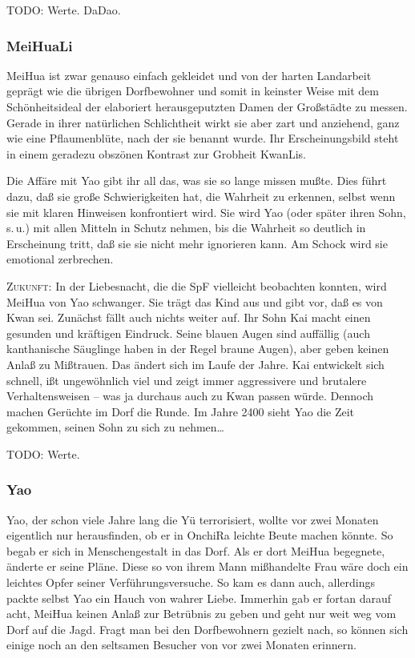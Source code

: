 \documentclass[
a4paper,
twoside,
DIV=calc,
BCOR=4mm,
fontsize=9pt,
twocolumn=on,
titlepage=on,
parskip=half
]{scrartcl}
\begin{document}
TODO: Werte. DaDao.

\subsubsection{MeiHuaLi}

MeiHua ist zwar genauso einfach gekleidet und von der harten
Landarbeit geprägt wie die übrigen Dorfbewohner und somit in keinster
Weise mit dem Schönheitsideal der elaboriert herausgeputzten Damen der
Großstädte zu messen. Gerade in ihrer natürlichen Schlichtheit wirkt
sie aber zart und anziehend, ganz wie eine Pflaumenblüte, nach der sie
benannt wurde. Ihr Erscheinungsbild steht in einem geradezu obszönen
Kontrast zur Grobheit KwanLis.

Die Affäre mit Yao gibt ihr all das, was sie so lange missen
mußte. Dies führt dazu, daß sie große Schwierigkeiten hat, die
Wahrheit zu erkennen, selbst wenn sie mit klaren Hinweisen
konfrontiert wird. Sie wird Yao (oder später ihren Sohn, s.\,u.) mit
allen Mitteln in Schutz nehmen, bis die Wahrheit so deutlich in
Erscheinung tritt, daß sie sie nicht mehr ignorieren kann. Am Schock
wird sie emotional zerbrechen.

\textsc{Zukunft:} In der Liebesnacht, die die SpF vielleicht
beobachten konnten, wird MeiHua von Yao schwanger. Sie trägt das Kind
aus und gibt vor, daß es von Kwan sei. Zunächst fällt auch nichts
weiter auf. Ihr Sohn Kai macht einen gesunden und kräftigen
Eindruck. Seine blauen Augen sind auffällig (auch kanthanische
Säuglinge haben in der Regel braune Augen), aber geben keinen Anlaß zu
Mißtrauen. Das ändert sich im Laufe der Jahre. Kai entwickelt sich
schnell, ißt ungewöhnlich viel und zeigt immer aggressivere und
brutalere Verhaltensweisen -- was ja durchaus auch zu Kwan passen
würde. Dennoch machen Gerüchte im Dorf die Runde. Im Jahre 2400 sieht
Yao die Zeit gekommen, seinen Sohn zu sich zu nehmen\dots

TODO: Werte.

\subsubsection{Yao}
\label{yao}

Yao, der schon viele Jahre lang die Yü terrorisiert, wollte vor zwei
Monaten eigentlich nur herausfinden, ob er in OnchiRa leichte Beute
machen könnte. So begab er sich in Menschengestalt in das Dorf. Als er
dort MeiHua begegnete, änderte er seine Pläne. Diese so von ihrem Mann
mißhandelte Frau wäre doch ein leichtes Opfer seiner
Verführungsversuche. So kam es dann auch, allerdings packte selbst Yao
ein Hauch von wahrer Liebe. Immerhin gab er fortan darauf acht, MeiHua
keinen Anlaß zur Betrübnis zu geben und geht nur weit weg vom Dorf auf
die Jagd. Fragt man bei den Dorfbewohnern gezielt nach, so können sich
einige noch an den seltsamen Besucher von vor zwei Monaten erinnern.
\end{document}
